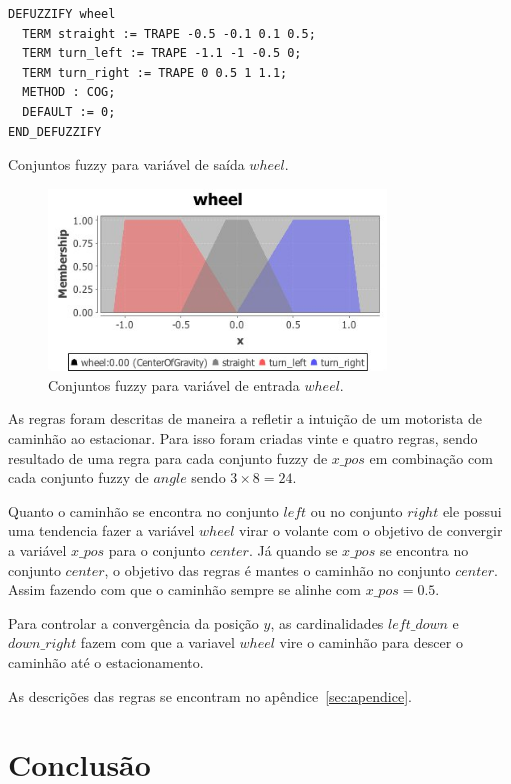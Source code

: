 \documentclass[12pt, a4paper]{article}
\begin{document}
\begin{listing}[h!]
  \begin{verbatim}
DEFUZZIFY wheel
  TERM straight := TRAPE -0.5 -0.1 0.1 0.5;
  TERM turn_left := TRAPE -1.1 -1 -0.5 0;
  TERM turn_right := TRAPE 0 0.5 1 1.1;
  METHOD : COG;
  DEFAULT := 0;
END_DEFUZZIFY
  \end{verbatim}
  \caption{Conjuntos fuzzy para variável de saída $wheel$.}\label{listing:wheelfuzzy}
\end{listing}

\begin{figure}[h!]
  \centering
  \includegraphics[width=0.8\textwidth]{assets/wheel.jpg}
  \caption{Conjuntos fuzzy para variável de entrada $wheel$.}\label{figure:wheelfuzzy}
\end{figure}

As regras foram descritas de maneira a refletir a intuição de um motorista de caminhão ao estacionar.
Para isso foram criadas vinte e quatro regras, sendo resultado de uma regra para cada conjunto fuzzy de $x\_pos$ em combinação com cada conjunto fuzzy de $angle$ sendo $3 \times 8 = 24$.

Quanto o caminhão se encontra no conjunto $left$ ou no conjunto $right$ ele possui uma tendencia fazer a variável $wheel$ virar o volante com o objetivo de convergir a variável $x\_pos$ para o conjunto $center$.
Já quando se $x\_pos$ se encontra no conjunto $center$, o objetivo das regras é mantes o caminhão no conjunto $center$.
Assim fazendo com que o caminhão sempre se alinhe com $x\_pos = 0.5$.

Para controlar a convergência da posição $y$, as cardinalidades $left\_down$ e $down\_right$ fazem com que a variavel $wheel$ vire o caminhão para descer o caminhão até o estacionamento.

As descrições das regras se encontram no apêndice~\ref{sec:apendice}.

\section{Conclusão}
\end{document}
